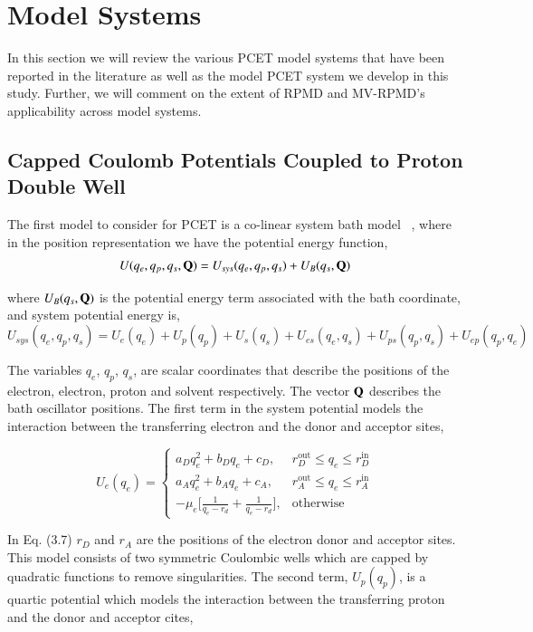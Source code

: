 \documentclass[phd,tocprelim]{cornell}
\begin{document}
\section{Model Systems}
In this section we will review the various PCET model systems that have been reported in the literature as well as the model PCET system we develop in this study. Further, we will comment on the extent of RPMD and MV-RPMD's applicability across model systems.  
\subsection{Capped Coulomb Potentials Coupled to Proton Double Well}
The first model to consider for PCET is a co-linear system bath model ~\cite{TFM2016}, where in the position representation we have the potential energy function,
\begin{equation}
U(q_e, q_p, q_s, {\bf{Q}})= U_{sys}(q_e, q_p, q_s) + U_B(q_s, {\bf{Q}})
\end{equation}

where $U_B(q_s, {\bf{Q}})$  is the potential energy term associated with the bath coordinate, and system potential energy is, 
\begin{equation}
 U_{sys}(q_e, q_p, q_s)=U_e(q_e)+ U_p(q_p)+U_s(q_s)+U_{es}(q_{e}, q_s)+U_{ps}(q_{p}, q_{s})+U_{ep}(q_{p}, q_{e})
\end{equation}

The variables $q_e$, $q_p$, $q_s$, are scalar coordinates that describe the positions of the electron, electron, proton and solvent respectively. The vector ${\bf{Q}}$ describes the bath oscillator positions. The first term in the system potential models the interaction between the transferring electron and the donor and acceptor sites, 

\begin{equation}
   U_e(q_e)=\left\{
     \begin{array}{ll}
     a_{D}q_e^2+b_Dq_e +c_D, & r_D^{\textrm{out}} \leq q_e \leq r_D^{\textrm{in}}\\
     a_{A}q_e^2+b_Aq_e +c_A, & r_A^{\textrm{out}} \leq q_e \leq r_A^{\textrm{in}}\\
     -\mu_e\bigg[ \frac{1}{q_e-r_d}+\frac{1}{q_e-r_d}\bigg], & \textrm{otherwise}
    \end{array}\right.
    \label{eq:hs}
\end{equation}

In Eq.  (3.7) $r_D$ and $r_A$ are the positions of the electron donor and acceptor sites. This model consists of two symmetric Coulombic wells which are capped by quadratic functions to remove singularities. The second term,  $ U_p(q_p)$, is a quartic potential which models the interaction between the transferring proton and the donor and acceptor cites,
\end{document}
